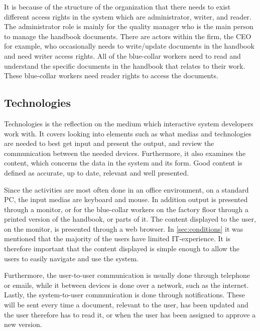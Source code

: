 It is because of the structure of the organization that there needs to exist different access rights in the system which are administrator, writer, and reader.
The administrator role is mainly for the quality manager who is the main person to manage the handbook documents.
There are actors within the firm, the CEO for example, who occasionally needs to write/update documents in the handbook and need writer access rights.
All of the blue-collar workers need to read and understand the specific documents in the handbook that relates to their work.
These blue-collar workers need reader rights to access the documents.

\subsection{Technologies}
Technologies is the reflection on the medium which interactive system developers work with.
It covers looking into elements such as what medias and technologies are needed to best get input and present the output, and review the communication between the needed devices.
Furthermore, it also examines the content, which concerns the data in the system and its form.
Good content is defined as accurate, up to date, relevant and well presented.

Since the activities are most often done in an office environment, on a standard PC, the input medias are keyboard and mouse.
In addition output is presented through a monitor, or for the blue-collar workers on the factory floor through a printed version of the handbook, or parts of it.
The content displayed to the user, on the monitor, is presented through a web browser.
In \cref{sec:conditions} it was mentioned that the majority of the users have limited IT-experience.
It is therefore important that the content displayed is simple enough to allow the users to easily navigate and use the system.

Furthermore, the user-to-user communication is usually done through telephone or emails, while it between devices is done over a network, such as the internet.
Lastly, the system-to-user communication is done through notifications.
These will be sent every time a document, relevant to the user, has been updated and the user therefore has to read it, or when the user has been assigned to approve a new version.

